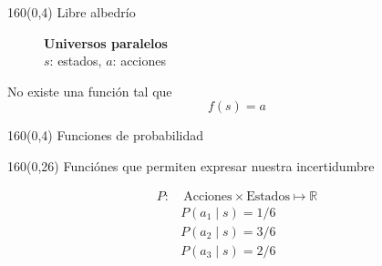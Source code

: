 \documentclass[shownotes,aspectratio=169]{beamer}
\begin{document}
\begin{frame}[plain]
 \begin{textblock}{160}(0,4)
 \centering \LARGE
Libre albedrío
\end{textblock}
\vspace{0.75cm}


 \begin{figure}[H]
\centering
    \caption*{\normalsize \textbf{Universos paralelos} \ \ \ \   \\ $s$: estados, $a$: acciones \ \ \ \  }
\end{figure}

\pause
\vspace{0.3cm}

\centering \Large No existe una funci\'on tal que 
 \begin{equation*}
  f(s)=a
 \end{equation*}

\end{frame}


\begin{frame}[plain]
 \begin{textblock}{160}(0,4)
 \centering \LARGE
Funciones de probabilidad
\end{textblock}
\vspace{1.25cm}

\begin{textblock}{160}(0,26)
\centering  \Large 
Funci\'ones que permiten expresar nuestra incertidumbre 
\end{textblock}

 
 \begin{align*}
 P : & \ \text{Acciones}\times\text{Estados} \mapsto \mathbb{R} \\
    &P(a_1 \mid s)  = 1/6 \\
   &P(a_2 \mid s)  = 3/6 \\
   &P(a_3 \mid s)  = 2/6 
 \end{align*}
 
 \vspace{0.3cm}
 
 
 
\end{frame}
\end{document}
